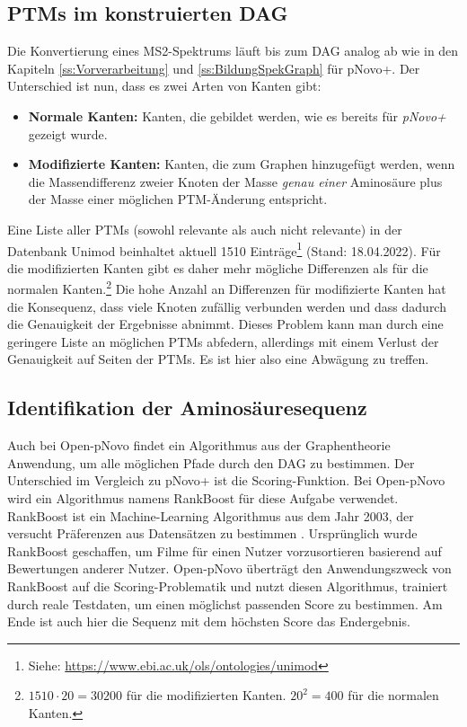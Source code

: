\documentclass[a4paper, 12pt]{article}
\newcommand{\gerquot}[1]{\glqq#1\grqq}
\begin{document}
\subsection{PTMs im konstruierten DAG}\label{ss:PTMUndDAG}
Die Konvertierung eines MS2-Spektrums läuft bis zum DAG analog ab wie in den Kapiteln \ref{ss:Vorverarbeitung} und \ref{ss:BildungSpekGraph} für pNovo+. Der Unterschied ist nun, dass es zwei Arten von Kanten gibt:

\begin{itemize}
   \item \textbf{\gerquot{Normale} Kanten:} Kanten, die gebildet werden, wie es bereits für \emph{pNovo+} gezeigt wurde.
   \item \textbf{\gerquot{Modifizierte} Kanten:} Kanten, die zum Graphen hinzugefügt werden, wenn die Massendifferenz zweier Knoten der Masse \emph{genau einer} Aminosäure plus der Masse einer möglichen PTM-Änderung entspricht.
\end{itemize}

Eine Liste aller PTMs (sowohl relevante als auch nicht relevante) in der Datenbank Unimod beinhaltet aktuell 1510 Einträge\footnote{Siehe: \url{https://www.ebi.ac.uk/ols/ontologies/unimod}} (Stand: 18.04.2022). Für die modifizierten Kanten gibt es daher mehr mögliche Differenzen als für die normalen Kanten.\footnote{$1510 \cdot 20 = 30200$ für die modifizierten Kanten. $20^2 = 400$ für die normalen Kanten.} Die hohe Anzahl an Differenzen für modifizierte Kanten hat die Konsequenz, dass viele Knoten zufällig verbunden werden und dass dadurch die Genauigkeit der Ergebnisse abnimmt. Dieses Problem kann man durch eine geringere Liste an möglichen PTMs abfedern, allerdings mit einem Verlust  der Genauigkeit auf Seiten der PTMs. Es ist hier also eine Abwägung zu treffen.

\subsection{Identifikation der Aminosäuresequenz}
Auch bei Open-pNovo findet ein Algorithmus aus der Graphentheorie Anwendung, um alle möglichen Pfade durch den DAG zu bestimmen. Der Unterschied im Vergleich zu pNovo+ ist die Scoring-Funktion. Bei Open-pNovo wird ein Algorithmus namens RankBoost für diese Aufgabe verwendet. RankBoost ist ein Machine-Learning Algorithmus aus dem Jahr 2003, der versucht Präferenzen aus Datensätzen zu bestimmen \cite[933]{freund2003efficient}. Ursprünglich wurde RankBoost geschaffen, um Filme für einen Nutzer vorzusortieren basierend auf Bewertungen anderer Nutzer. Open-pNovo überträgt den Anwendungszweck von RankBoost auf die Scoring-Problematik und nutzt diesen Algorithmus, trainiert durch reale Testdaten, um einen möglichst passenden Score zu bestimmen. Am Ende ist auch hier die Sequenz mit dem höchsten Score das Endergebnis.
\end{document}
